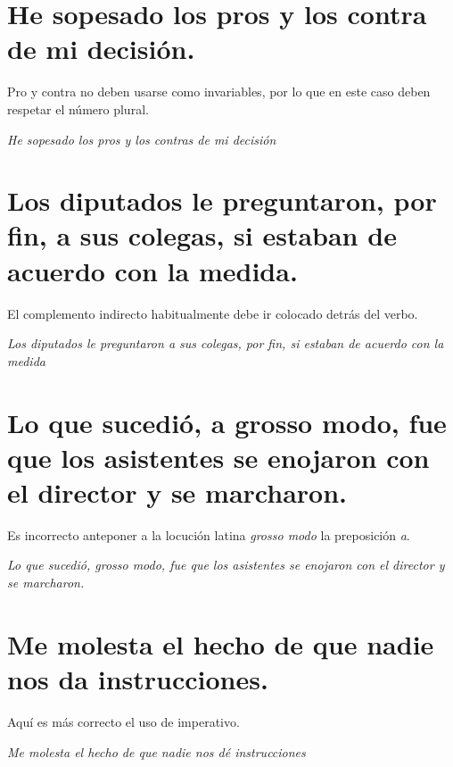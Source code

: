 \documentclass[12pt, a4paper, oneside]{report}
\begin{document}
        \section{He sopesado los pros y los \color{rojo}contra\color{negro} \;de mi decisión.}
        Pro y contra no deben usarse como invariables, por lo que en este caso deben respetar el número
        plural.
        \begin{center}
            \textit{He sopesado los pros y los \color{verde}contras\color{negro} \;de mi decisión}
        \end{center}
        \clearpage

        \setcounter{chapter}{2}
        \setcounter{section}{0}

        \section{Los diputados le preguntaron, \color{rojo}por fin, a sus colegas,\color{negro} \;si estaban
        de acuerdo con la medida.}
        El complemento indirecto habitualmente debe ir colocado detrás del verbo.
        \begin{center}
            \textit{Los diputados le preguntaron \color{verde}a sus colegas, por fin,\color{negro} \;si
            estaban de acuerdo con la medida}
        \end{center}

        \section{Lo que sucedió, \color{rojo}a grosso modo\color{negro}, fue que los asistentes se enojaron
        con el director y se marcharon.}
        Es incorrecto anteponer a la locución latina \emph{grosso modo} la preposición \emph{a}.
        \begin{center}
            \textit{Lo que sucedió, \color{verde}grosso modo\color{negro}, fue que los asistentes se
            enojaron con el director y se marcharon.}
        \end{center}

        \section{Me molesta el hecho de que nadie nos \color{rojo}da\color{negro} \;instrucciones.}
        Aquí es más correcto el uso de imperativo.
        \begin{center}
            \textit{Me molesta el hecho de que nadie nos \color{verde}dé\color{negro} \;instrucciones}
        \end{center}
\end{document}
